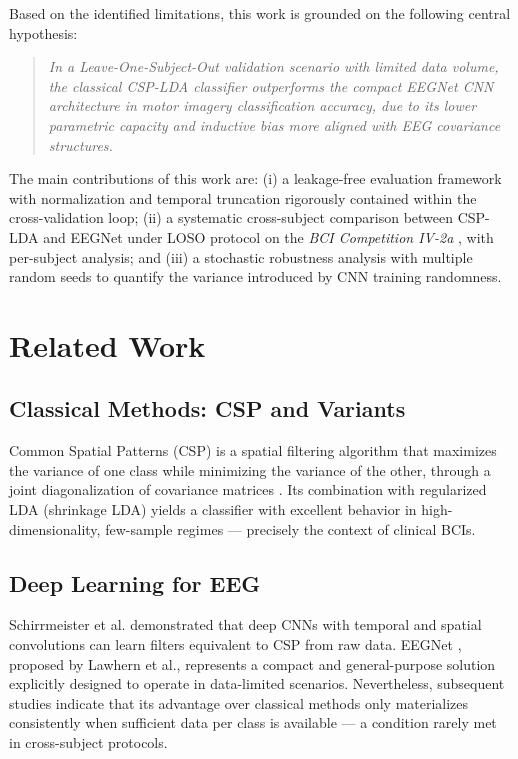 \documentclass[conference]{IEEEtran}
\begin{document}
Based on the identified limitations, this work is grounded on the following central hypothesis:

\begin{quote}
\textit{In a Leave-One-Subject-Out validation scenario with limited data volume, the classical CSP-LDA classifier outperforms the compact EEGNet CNN architecture in motor imagery classification accuracy, due to its lower parametric capacity and inductive bias more aligned with EEG covariance structures.}
\end{quote}

The main contributions of this work are: (i) a leakage-free evaluation framework with normalization and temporal truncation rigorously contained within the cross-validation loop; (ii) a systematic cross-subject comparison between CSP-LDA and EEGNet under LOSO protocol on the \textit{BCI Competition IV-2a} \cite{tangermann2012review, brunner2008bci}, with per-subject analysis; and (iii) a stochastic robustness analysis with multiple random seeds to quantify the variance introduced by CNN training randomness.

\section{Related Work}

\subsection{Classical Methods: CSP and Variants}

Common Spatial Patterns (CSP) is a spatial filtering algorithm that maximizes the variance of one class while minimizing the variance of the other, through a joint diagonalization of covariance matrices \cite{blankertz2008optimizing}. Its combination with regularized LDA (shrinkage LDA) yields a classifier with excellent behavior in high-dimensionality, few-sample regimes --- precisely the context of clinical BCIs.

\subsection{Deep Learning for EEG}

Schirrmeister et al. \cite{schirrmeister2017deep} demonstrated that deep CNNs with temporal and spatial convolutions can learn filters equivalent to CSP from raw data. EEGNet \cite{lawhern2018eegnet}, proposed by Lawhern et al., represents a compact and general-purpose solution explicitly designed to operate in data-limited scenarios. Nevertheless, subsequent studies indicate that its advantage over classical methods only materializes consistently when sufficient data per class is available --- a condition rarely met in cross-subject protocols.
\end{document}
